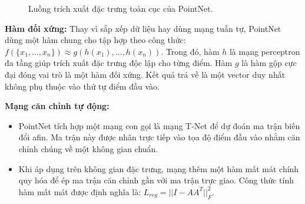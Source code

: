 \begin{figure}[H]
\centering
{}
\caption{Luồng trích xuất đặc trưng toàn cục của PointNet.}
\label{fig:pointnet-arch}
\end{figure}

\textbf{Hàm đối xứng:} Thay vì sắp xếp dữ liệu hay dùng mạng tuần tự, PointNet dùng một hàm chung cho tập hợp theo công thức: $f(\{x_1,...,x_n\}) \approx g(h(x_1),...,h(x_n))$. Trong đó, hàm $h$ là mạng perceptron đa tầng giúp trích xuất đặc trưng độc lập cho từng điểm. Hàm $g$ là hàm gộp cực đại đóng vai trò là một hàm đối xứng. Kết quả trả về là một vector duy nhất không phụ thuộc vào thứ tự điểm đầu vào.


\textbf{Mạng căn chỉnh tự động:}
\begin{itemize}
    \item PointNet tích hợp một mạng con gọi là mạng T-Net để dự đoán ma trận biến đổi afin. Ma trận này được nhân trực tiếp vào tọa độ điểm đầu vào nhằm căn chỉnh chúng về một không gian chuẩn.
    \item Khi áp dụng trên không gian đặc trưng, mạng thêm một hàm mất mát chính quy hóa để ép ma trận căn chỉnh gần với ma trận trực giao. Công thức tính hàm mất mát được định nghĩa là: $L_{reg} = ||I - AA^T||_F^2$.
\end{itemize}

